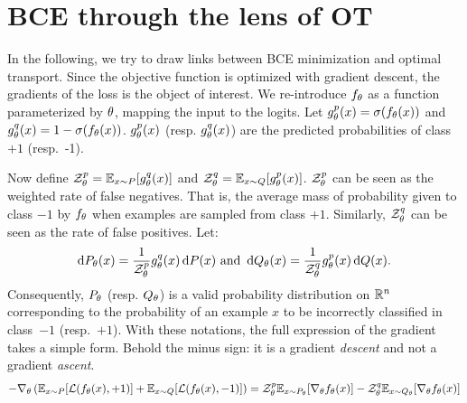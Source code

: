 
\section{BCE through the lens of OT}\label{ap:bceot}
In the following, we try to draw links between BCE minimization and optimal transport. Since the objective function is optimized with gradient descent, the gradients of the loss is the object of interest. We re-introduce $f_{\theta}$ as a function parameterized by $\theta$, mapping the input to the logits. Let $g^p_{\theta}(x)=\sigma(f_{\theta}(x))$ and $g^q_{\theta}(x)=1-\sigma(f_{\theta}(x))$. $g^p_{\theta}(x)$ (resp. $g^q_{\theta}(x)$) are the predicted probabilities of \mbox{class $+1$} (\mbox{resp. -1}). %
  
Now define $\mathcal{Z}^p_{\theta}=\mathbb{E}_{x\sim P}[g^q_{\theta}(x)]$ and $\mathcal{Z}^q_{\theta}=\mathbb{E}_{x\sim Q}[g^p_{\theta}(x)]$.
$\mathcal{Z}^p_{\theta}$ can be seen as the weighted rate of false negatives. That is, the average mass of probability given to class $-1$ by $f_{\theta}$ when examples are sampled from class $+1$. Similarly, $\mathcal{Z}^q_{\theta}$ can be seen as the rate of false positives. Let:
\begin{equation}
    \begin{alignedat}{2}
        \operatorname{d\!}{} P_{\theta}(x)=\frac{1}{\mathcal{Z}^p_{\theta}}g^q_{\theta}(x)\operatorname{d\!}{} P(x)\text{ and }\operatorname{d\!}{} Q_{\theta}(x)=\frac{1}{\mathcal{Z}^q_{\theta}}g^p_{\theta}(x)\operatorname{d\!}{} Q(x).
    \end{alignedat}
\end{equation}
Consequently, $P_{\theta}$ (resp. $Q_{\theta}$) is a valid probability distribution on $\mathbb{R}^n$ corresponding to the probability of an example $x$ to be incorrectly classified in class~$-1$ (resp.~$+1$). With these notations, the full expression of the gradient takes a simple form. Behold the minus sign: it is a gradient \textit{descent} and not a gradient \textit{ascent}.
\begin{equation}
        -\nabla_{\theta}\left(\mathbb{E}_{x\sim P}[\mathcal{L}(f_{\theta}(x),+1)]+\mathbb{E}_{x\sim Q}[\mathcal{L}(f_{\theta}(x),-1)]\right)=\mathcal{Z}^p_{\theta}\mathbb{E}_{x\sim P_{\theta}}[\nabla_{\theta}f_{\theta}(x)]-\mathcal{Z}^q_{\theta}\mathbb{E}_{x\sim Q_{\theta}}[\nabla_{\theta}f_{\theta}(x)]
\end{equation}

